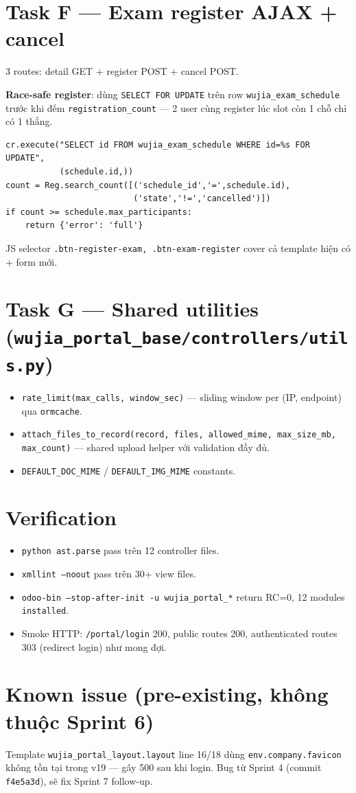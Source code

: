 \section{Task F --- Exam register AJAX + cancel}

3 routes: detail GET + register POST + cancel POST.

\textbf{Race-safe register}: dùng \texttt{SELECT FOR UPDATE} trên row \texttt{wujia\_exam\_schedule} trước khi đếm \texttt{registration\_count} --- 2 user cùng register lúc slot còn 1 chỗ chỉ có 1 thắng.

\begin{lstlisting}[style=python]
cr.execute("SELECT id FROM wujia_exam_schedule WHERE id=%s FOR UPDATE",
           (schedule.id,))
count = Reg.search_count([('schedule_id','=',schedule.id),
                          ('state','!=','cancelled')])
if count >= schedule.max_participants:
    return {'error': 'full'}
\end{lstlisting}

JS selector \texttt{.btn-register-exam, .btn-exam-register} cover cả template hiện có + form mới.

\section{Task G --- Shared utilities (\texttt{wujia\_portal\_base/controllers/utils.py})}

\begin{itemize}[leftmargin=*]
    \item \texttt{rate\_limit(max\_calls, window\_sec)} --- sliding window per (IP, endpoint) qua \texttt{ormcache}.
    \item \texttt{attach\_files\_to\_record(record, files, allowed\_mime, max\_size\_mb, max\_count)} --- shared upload helper với validation đầy đủ.
    \item \texttt{DEFAULT\_DOC\_MIME} / \texttt{DEFAULT\_IMG\_MIME} constants.
\end{itemize}

\section{Verification}

\begin{itemize}[leftmargin=*]
    \item \texttt{python ast.parse} pass trên 12 controller files.
    \item \texttt{xmllint --noout} pass trên 30+ view files.
    \item \texttt{odoo-bin --stop-after-init -u wujia\_portal\_*} return RC=0, 12 modules \texttt{installed}.
    \item Smoke HTTP: \texttt{/portal/login} 200, public routes 200, authenticated routes 303 (redirect login) như mong đợi.
\end{itemize}

\section{Known issue (pre-existing, không thuộc Sprint 6)}

Template \texttt{wujia\_portal\_layout.layout} line 16/18 dùng \texttt{env.company.favicon} không tồn tại trong v19 --- gây 500 sau khi login. Bug từ Sprint 4 (commit \texttt{f4e5a3d}), sẽ fix Sprint 7 follow-up.
